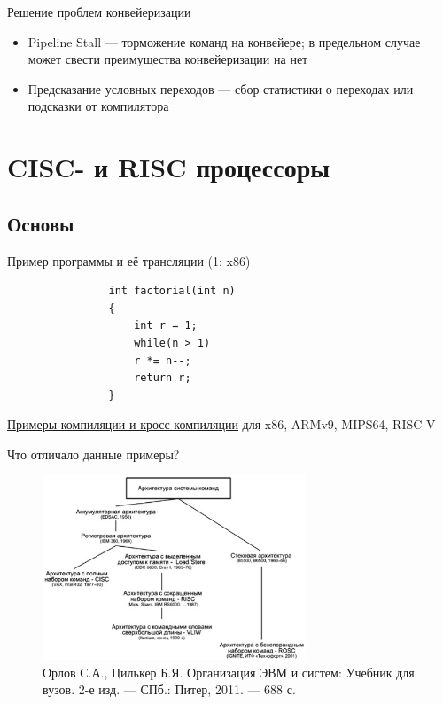 \documentclass[xetex,aspectratio=43]{beamer}
\begin{document}
\begin{frame}{Решение проблем конвейеризации}
    \begin{itemize}
        \item Pipeline Stall — торможение команд на конвейере; в предельном случае может свести преимущества конвейеризации на нет
        \item Предсказание условных переходов — сбор статистики о переходах или подсказки от компилятора
    \end{itemize}
\end{frame}

\section{CISC- и RISC процессоры}

\subsection{Основы}

\begin{frame}[fragile]{Пример программы и её трансляции (1: x86)}
    \begin{center}
        \begin{minipage}{0.4\linewidth}
            \begin{verbatim}
                int factorial(int n)
                {
                    int r = 1;
                    while(n > 1)
                    r *= n--;
                    return r;
                }
            \end{verbatim}
        \end{minipage}
    \end{center}

\href{https://github.com/dluciv/Computer_Architecture-SPbU-CB.5080/tree/main/examples/cross-compiling}{Примеры компиляции и кросс-компиляции} для x86, ARMv9, MIPS64, RISC-V

\end{frame}

\begin{frame}{Что отличало данные примеры?}
    \begin{figure}
    \includegraphics[width=0.7\textwidth]{img/11.instr_sets.png}
    \caption{Орлов С.А., Цилькер Б.Я. Организация ЭВМ и систем: Учебник для вузов. 2-е изд. — СПб.: Питер, 2011. — 688 с.}
    \end{figure}
\end{frame}
\end{document}
